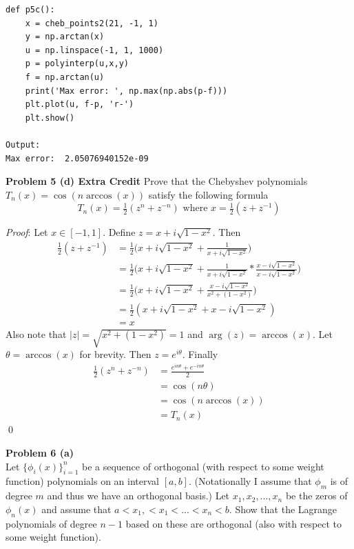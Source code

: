 \documentclass[12pt]{article}
\newcommand{\problem}[1]{\hspace{-4 ex} \large \textbf{Problem #1} }
\renewenvironment{proof}{\hspace{-4 ex} \emph{Proof}:}{\qed}
\begin{document}
	\begin{lstlisting}
def p5c():
	x = cheb_points2(21, -1, 1)
	y = np.arctan(x)
	u = np.linspace(-1, 1, 1000)
	p = polyinterp(u,x,y)
	f = np.arctan(u)
	print('Max error: ', np.max(np.abs(p-f)))
	plt.plot(u, f-p, 'r-')
	plt.show()	
	
Output: 
Max error:  2.05076940152e-09
	\end{lstlisting}

\bigbreak
\problem{5 (d) Extra Credit} Prove that the Chebyshev polynomials $T_n(x) = \cos(n\arccos(x))$ satisfy the following formula
$$
T_n(x) = \tfrac{1}{2}(z^n + z^{-n}) \text{\ \ \ \ \ where \ \ \ \ \ } x = \tfrac{1}{2}(z + z^{-1})
$$

	\begin{proof}
		Let $x \in [-1,1]$. Define $z = x + i\sqrt{1-x^2}$. Then
		\begin{align*}
			\tfrac{1}{2}(z + z^{-1}) & = \tfrac{1}{2} \Bigg(x + i\sqrt{1-x^2} + \frac{1}{x + i\sqrt{1-x^2}} \Bigg) \\
			& = \tfrac{1}{2} \Bigg(x + i\sqrt{1-x^2} + \frac{1}{x + i\sqrt{1-x^2}} * \frac{x - i\sqrt{1-x^2}}{x - i\sqrt{1-x^2}} \Bigg ) \\ 
			& = \tfrac{1}{2} \Bigg(x + i\sqrt{1-x^2} + \frac{x - i\sqrt{1-x^2}}{x^2 + (1-x^2)}\Bigg ) \\ 
			& = \tfrac{1}{2} (x + i\sqrt{1-x^2} + x - i\sqrt{1-x^2} ) \\ 
			& = x
		\end{align*}
		Also note that $\vert z \vert = \sqrt{x^2 + (1-x^2)} = 1$ and $\arg(z) = \arccos(x)$. Let $\theta = \arccos(x)$ for brevity. Then
		$z = e^{i\theta}$. Finally
		\begin{align*}
			\tfrac{1}{2}(z^n + z^{-n}) & = \frac{e^{in\theta} + e^{-in\theta}}{2} \\
			& = \cos(n\theta) \\
			& = \cos(n \arccos(x)) \\
			& = T_n(x)
		\end{align*}
	\end{proof}

\bigbreak
\problem{6 (a)} \\

	Let $\{\phi_i(x)\}_{i=1}^n$ be a sequence of orthogonal (with respect to some weight function) polynomials on an interval $[a,b]$. (Notationally I assume that $\phi_m$ is of degree $m$ and thus we have an orthogonal basis.) Let $x_1, x_2, ..., x_n$ be the zeros of $\phi_n(x)$ and assume that $a < x_1, < x_1 < ... < x_n < b$. Show that the Lagrange polynomials of degree $n-1$ based on these are orthogonal (also with respect to some weight function).
	
\end{document}

